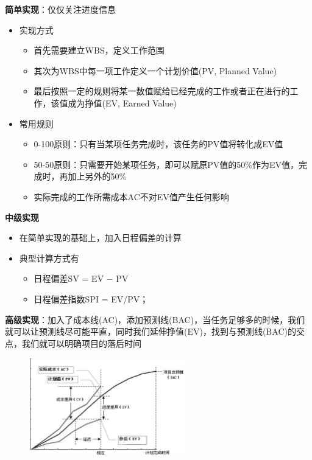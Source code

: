 \begin{solution}
\textbf{简单实现}：仅仅关注进度信息
\begin{itemize}
    \item 实现方式
    \begin{itemize}
        \item 首先需要建立WBS，定义工作范围
        \item 其次为WBS中每一项工作定义一个计划价值(PV, Planned Value)
        \item 最后按照一定的规则将某一数值赋给已经完成的工作或者正在进行的工作，该值成为挣值(EV, Earned Value)
    \end{itemize}
    \item 常用规则
    \begin{itemize}
        \item 0-100原则：只有当某项任务完成时，该任务的PV值将转化成EV值
        \item 50-50原则：只需要开始某项任务，即可以赋原PV值的50\%作为EV值，完成时，再加上另外的50\%
        \item 实际完成的工作所需成本AC不对EV值产生任何影响
    \end{itemize}
\end{itemize}

\textbf{中级实现}
\begin{itemize}
    \item 在简单实现的基础上，加入日程偏差的计算
    \item 典型计算方式有
    \vspace{-0.8em}
    \begin{multicols}{2}
        \begin{itemize}
            \item 日程偏差SV = EV $-$ PV
            \item 日程偏差指数SPI = EV/PV；
        \end{itemize}
    \end{multicols}
    \vspace{-1em}
\end{itemize}

\textbf{高级实现}：加入了成本线(AC)，添加预测线(BAC)，当任务足够多的时候，我们就可以让预测线尽可能平直，同时我们延伸挣值(EV)，找到与预测线(BAC)的交点，我们就可以明确项目的落后时间

\begin{figure}[H]
    \vspace{-0.5em}
	\centering
	\includegraphics[width=0.6\textwidth]{挣值管理图解.png}
    \vspace{-1em}
\end{figure}


\end{solution}
